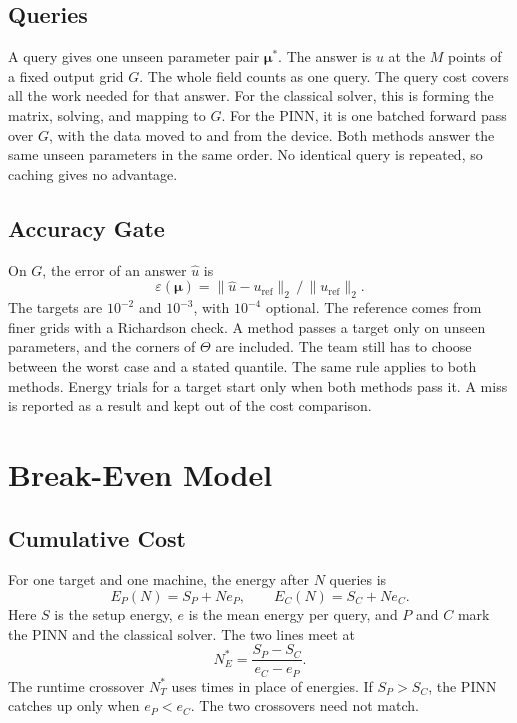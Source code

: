 \documentclass[conference]{IEEEtran}
\newcommand{\Nstar}{N^{\ast}}
\begin{document}
\subsection{Queries}
A query gives one unseen parameter pair $\boldsymbol{\mu}^\ast$. The answer is $u$ at the $M$ points of a fixed output grid $G$. The whole field counts as one query. The query cost covers all the work needed for that answer. For the classical solver, this is forming the matrix, solving, and mapping to $G$. For the PINN, it is one batched forward pass over $G$, with the data moved to and from the device. Both methods answer the same unseen parameters in the same order. No identical query is repeated, so caching gives no advantage.

\subsection{Accuracy Gate}
On $G$, the error of an answer $\hat u$ is
\begin{equation}
\varepsilon(\boldsymbol{\mu})=\lVert\hat u-u_{\mathrm{ref}}\rVert_2\,/\,\lVert u_{\mathrm{ref}}\rVert_2 .
\label{eq:err}
\end{equation}
The targets are $10^{-2}$ and $10^{-3}$, with $10^{-4}$ optional. The reference comes from finer grids with a Richardson check. A method passes a target only on unseen parameters, and the corners of $\Theta$ are included. The team still has to choose between the worst case and a stated quantile. The same rule applies to both methods. Energy trials for a target start only when both methods pass it. A miss is reported as a result and kept out of the cost comparison.

\section{Break-Even Model}\label{sec:model}

\subsection{Cumulative Cost}
For one target and one machine, the energy after $N$ queries is
\begin{equation}
E_P(N)=S_P+N e_P,\qquad E_C(N)=S_C+N e_C .
\label{eq:cost}
\end{equation}
Here $S$ is the setup energy, $e$ is the mean energy per query, and $P$ and $C$ mark the PINN and the classical solver. The two lines meet at
\begin{equation}
\Nstar_E=\frac{S_P-S_C}{e_C-e_P}.
\label{eq:nstar}
\end{equation}
The runtime crossover $\Nstar_T$ uses times in place of energies. If $S_P>S_C$, the PINN catches up only when $e_P<e_C$. The two crossovers need not match.
\end{document}
